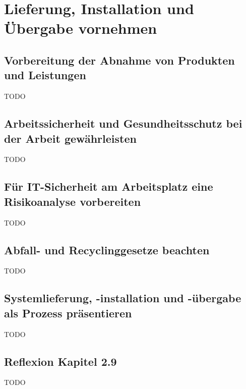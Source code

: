 \section{Lieferung, Installation und Übergabe vornehmen}
\subsection{Vorbereitung der Abnahme von Produkten und Leistungen}
    TODO
\subsection{Arbeitssicherheit und Gesundheitsschutz bei der Arbeit gewährleisten}
    TODO
\subsection{Für IT-Sicherheit am Arbeitsplatz eine Risikoanalyse vorbereiten}
    TODO
\subsection{Abfall- und Recyclinggesetze beachten}
    TODO
\subsection{Systemlieferung, -installation und -übergabe als Prozess präsentieren}
    TODO
\subsection*{Reflexion Kapitel 2.9}
    \begin{refindent}
        TODO
    \end{refindent}